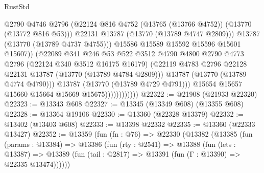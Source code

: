 \begin{lexlean}{RustStd}
\begin{coremodule}
                                      @2790
                                      @4746
                                      @2796
                                      (@22124
                                        @816
                                        @4752
                                        (@13765 (@13766 @4752))
                                        (@13770 (@13772 @816 @53)))
                                      @22131
                                      @13787
                                      (@13770 (@13789 @4747 @2809)))
                                    @13787
                                    (@13770 (@13789 @4737 @4755)))
                                  @15586
                                  @15589
                                  @15592
                                  @15596
                                  @15601
                                  @15607))
                              (@22089
                                @341
                                @246
                                @53
                                @522
                                @3512
                                @4790
                                @4800
                                @2790
                                @4773
                                @2796
                                (@22124 @340 @3512 @16175 @16179)
                                (@22119
                                  @4783
                                  @2796
                                  @22128
                                  @22131
                                  @13787
                                  (@13770 (@13789 @4784 @2809)))
                                @13787
                                (@13770 (@13789 @4774 @4790)))
                              @13787
                              (@13770 (@13789 @4729 @4791)))
                            @15654
                            @15657
                            @15660
                            @15664
                            @15669
                            @15675))))))))))))
@22322 := @21908 (@21933 @22320)
@22323 := @13343 @608
@22327 := @13345 (@13349 @608) (@13355 @608)
@22328 := @13364 @19106
@22330 := @13360 (@22328 @13379)
@22332 := @13402 (@13403 @608)
@22333 := @13398 @22332
@22335 := @13360 (@22333 @13427)
@22352 := @13359
    (fun (fn : @76) =>
    @22330
      (@13382
        (@13385
          (fun (params : @13384) =>
          @13386
            (fun (rty : @2541) =>
            @13388
              (fun (lets : @13387) =>
              @13389 (fun (tail : @2817) => @13391 (fun (Γ : @13390) => @22335 @13474))))))

\end{coremodule}
\end{lexlean}
